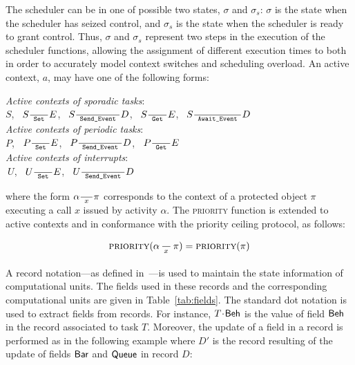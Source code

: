 The scheduler can be in one of possible two states, $\sigma$ and
$\sigma_s$: $\sigma$ is the state when the scheduler has seized
control, and $\sigma_s$ is the state when the scheduler is ready to
grant control. Thus, $\sigma$ and $\sigma_s$ represent two steps in
the execution of the scheduler functions, allowing the assignment of
different execution times to both in order to accurately model context
switches and scheduling overload. An active context, $a$, may have one
of the following forms:\\

\begin{center}
\emph{Active contexts of sporadic tasks}:\\
    \hspace*{2mm} $S$,  
	\  $S \frac{}{\text{\ttfamily\ Set\ }} E$, 
	\ $S \frac{}{\text{\ttfamily\ Send\_Event\ }} D$, 
	\ $S \frac{}{\text{\ttfamily\ Get\ }} E$, 
	\ $S  \frac{}{\text{\ttfamily\ Await\_Event\ }}  D$ \vspace{1mm} \\
\emph{Active contexts of periodic tasks}: \\
     \hspace*{2mm} $P$, 
	\  $P \frac{}{\text{\ttfamily\ Set\ }} E$, 
	\  $P \frac{}{\text{\ttfamily\ Send\_Event\ }} D$,  
	\  $P \frac{}{\text{\ttfamily\ Get\ }} E$ 	\vspace{2mm} \\
\emph{Active contexts of interrupts}: \\
     \hspace*{2mm} $\ U$, 
	\  $U \frac{}{\text{\ttfamily\ Set\ }} E$, 
	\  $U \frac{}{\text{\ttfamily\ Send\_Event\ }} D$  \\
\end{center}
%
%
where the form $\alpha \frac{}{\large \ x \ } \pi$ corresponds  to the context of a protected
object $\pi$ executing a call $x$ issued by activity
$\alpha$. The {\scshape priority} function is extended to active
contexts and in conformance with the priority ceiling protocol, as follows:

\begin{equation}
\label{eq:pcp_rule}
  \text{{\scshape priority}}(\alpha\,\frac{}{\,^{{x}}\,}\,\pi) = 
  \text{{\scshape priority}}(\pi)
\end{equation}

A record notation---as defined in~\cite{cardelli@mfps90}---is used to
maintain the state information of computational units. The fields used
in these records and the corresponding computational units are given
in Table~\ref{tab:fields}. The standard dot notation is used to
extract fields from records. For instance, $T\!\cdot\!\text{\sffamily
  Beh}$ is the value of field $\text{\sffamily Beh}$ in the record
associated to task $T$. Moreover, the update of a field in a record is
performed as in the following example where $D'$ is the record
resulting of the update of fields $\text{\sffamily Bar}$ and $\text{\sffamily Queue}$ in
record $D$:


